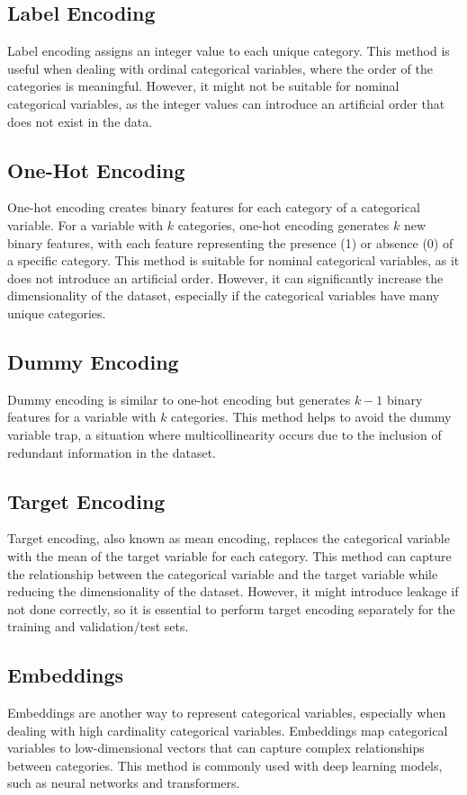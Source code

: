 \documentclass[12pt]{article}
\begin{document}
\subsection{Label Encoding}
Label encoding assigns an integer value to each unique category. This method is useful when dealing with ordinal categorical variables, where the order of the categories is meaningful. However, it might not be suitable for nominal categorical variables, as the integer values can introduce an artificial order that does not exist in the data.

\subsection{One-Hot Encoding}
One-hot encoding creates binary features for each category of a categorical variable. For a variable with $k$ categories, one-hot encoding generates $k$ new binary features, with each feature representing the presence (1) or absence (0) of a specific category. This method is suitable for nominal categorical variables, as it does not introduce an artificial order. However, it can significantly increase the dimensionality of the dataset, especially if the categorical variables have many unique categories.

\subsection{Dummy Encoding}
Dummy encoding is similar to one-hot encoding but generates $k-1$ binary features for a variable with $k$ categories. This method helps to avoid the dummy variable trap, a situation where multicollinearity occurs due to the inclusion of redundant information in the dataset.

\subsection{Target Encoding}
Target encoding, also known as mean encoding, replaces the categorical variable with the mean of the target variable for each category. This method can capture the relationship between the categorical variable and the target variable while reducing the dimensionality of the dataset. However, it might introduce leakage if not done correctly, so it is essential to perform target encoding separately for the training and validation/test sets.

\subsection{Embeddings}
Embeddings are another way to represent categorical variables, especially when dealing with high cardinality categorical variables. Embeddings map categorical variables to low-dimensional vectors that can capture complex relationships between categories. This method is commonly used with deep learning models, such as neural networks and transformers.
\end{document}
